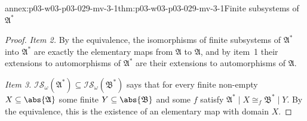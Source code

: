 \begin{annexitem}{annex:p03-w03-p03-029-mv-3-1}{thm:p03-w03-p03-029-mv-3-1}{Finite subsystems of \(\mathfrak A^*\)}
\begin{proof}
\emph{Item 2.} By the equivalence, the isomorphisms of finite subsystems of
\(\mathfrak A^*\) into \(\mathfrak A^*\) are exactly the elementary maps from
\(\mathfrak A\) to \(\mathfrak A\), and by item~1 their extensions to
automorphisms of \(\mathfrak A^*\) are their extensions to automorphisms of
\(\mathfrak A\).

\emph{Item 3.} \(\mathscr I\mathscr S_\omega(\mathfrak A^*)\subseteq\mathscr
I\mathscr S_\omega(\mathfrak B^*)\) says that for every finite non-empty
\(X\subseteq\abs{\mathfrak A}\) some finite \(Y\subseteq\abs{\mathfrak B}\)
and some \(f\) satisfy \(\mathfrak A^*\mathbin{|}X\cong_f\mathfrak
B^*\mathbin{|}Y\). By the equivalence, this is the existence of an elementary
map with domain \(X\).
\end{proof}
\end{annexitem}


